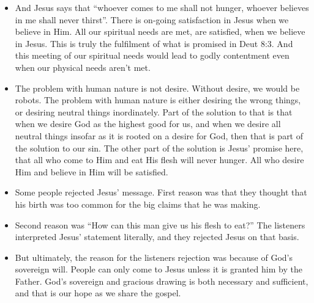 \begin{itemize}
  \item{And Jesus says that “whoever comes to me shall not hunger, whoever believes in me shall never thirst”. There is on-going satisfaction in Jesus when we believe in Him. All our spiritual needs are met, are satisfied, when we believe in Jesus. This is truly the fulfilment of what is promised in Deut 8:3. And this meeting of our spiritual needs would lead to godly contentment even when our physical needs aren’t met. }
  \item{The problem with human nature is not desire. Without desire, we would be robots. The problem with human nature is either desiring the wrong things, or desiring neutral things inordinately. Part of the solution to that is that when we desire God as the highest good for us, and when we desire all neutral things insofar as it is rooted on a desire for God, then that is part of the solution to our sin. The other part of the solution is Jesus’ promise here, that all who come to Him and eat His flesh will never hunger. All who desire Him and believe in Him will be satisfied. }
  \item{Some people rejected Jesus’ message. First reason was that they thought that his birth was too common for the big claims that he was making. }
  \item{Second reason was “How can this man give us his flesh to eat?” The listeners interpreted Jesus’ statement literally, and they rejected Jesus on that basis. }
  \item{But ultimately, the reason for the listeners rejection was because of God’s sovereign will. People can only come to Jesus unless it is granted him by the Father. God’s sovereign and gracious drawing is both necessary and sufficient, and that is our hope as we share the gospel. }
\end{itemize}
